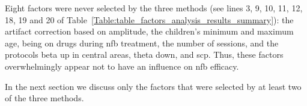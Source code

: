 Eight factors were never selected by the three methods (see lines 3, 9, 10, 11, 12, 18, 19 and 20 of 
Table~\ref{Table:table_factors_analysis_results_summary}): the artifact correction based on amplitude, the children's minimum and maximum age, 
being on drugs during \gls{nfb} treatment, the number of sessions, and the protocols beta up in central areas, theta down, and \gls{scp}. 
Thus, these factors overwhelmingly appear not to have an influence on \gls{nfb} efficacy.  

In the next section we discuss only the factors that were selected by at least two of the three methods. 

